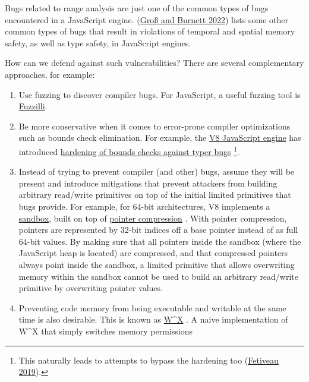 \documentclass[
  a4paper,
]{report}
\providecommand{\tightlist}{%
  \setlength{\itemsep}{0pt}\setlength{\parskip}{0pt}}
\begin{document}
Bugs related to range analysis are just one of the common types of bugs
encountered in a JavaScript engine.
(\protect\hyperlink{ref-Grouxdf2022}{Groß and Burnett 2022}) lists some
other common types of bugs that result in violations of temporal and
spatial memory safety, as well as type safety, in JavaScript engines.

How can we defend against such vulnerabilities? There are several
complementary approaches, for example:

\begin{enumerate}
\def\labelenumi{\arabic{enumi}.}
\tightlist
\item
  Use fuzzing to discover compiler bugs. For JavaScript, a useful
  fuzzing tool is
  \href{https://github.com/googleprojectzero/fuzzilli}{Fuzzilli}.
\item
  Be more conservative when it comes to error-prone compiler
  optimizations such as bounds check elimination. For example, the
  \href{https://v8.dev/}{V8 JavaScript engine} has introduced
  \href{https://bugs.chromium.org/p/v8/issues/detail?id=8806}{hardening
  of bounds checks against typer bugs} \footnote{This naturally leads to
    attempts to bypass the hardening too
    (\protect\hyperlink{ref-Fetiveau2019}{Fetiveau 2019}).}.
\item
  Instead of trying to prevent compiler (and other) bugs, assume they
  will be present and introduce mitigations that prevent attackers from
  building arbitrary read/write primitives on top of the initial limited
  primitives that bugs provide. For example, for 64-bit architectures,
  V8 implements a
  \href{https://docs.google.com/document/d/1FM4fQmIhEqPG8uGp5o9A-mnPB5BOeScZYpkHjo0KKA8/edit}{sandbox},
  built on top of \href{https://v8.dev/blog/pointer-compression}{pointer
  compression} . With pointer compression,
  pointers are represented by 32-bit indices off a base pointer instead
  of as full 64-bit values. By making sure that all pointers inside the
  sandbox (where the JavaScript heap is located) are compressed, and
  that compressed pointers always point inside the sandbox, a limited
  primitive that allows overwriting memory within the sandbox cannot be
  used to build an arbitrary read/write primitive by overwriting pointer
  values.
\item
  Preventing code memory from being executable and writable at the same
  time is also desirable. This is known as
  \href{https://en.wikipedia.org/wiki/W\%5EX}{W\^{}X} . A
  naive implementation of W\^{}X that simply switches memory permissions

\end{enumerate}
\end{document}
